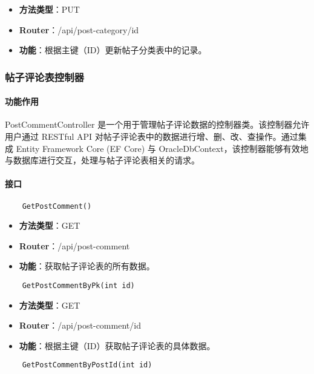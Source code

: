 \begin{itemize}
	\item \textbf{方法类型}：PUT
	\item \textbf{Router}：/api/post-category/{id}
	\item \textbf{功能}：根据主键（ID）更新帖子分类表中的记录。
\end{itemize}

\subsubsection{帖子评论表控制器}

\paragraph{功能作用}

PostCommentController 是一个用于管理帖子评论数据的控制器类。该控制器允许用户通过 RESTful API 对帖子评论表中的数据进行增、删、改、查操作。通过集成 Entity Framework Core (EF Core) 与 OracleDbContext，该控制器能够有效地与数据库进行交互，处理与帖子评论表相关的请求。

\paragraph{接口}

\begin{verbatim}
	GetPostComment()
\end{verbatim}

\begin{itemize}
	\item \textbf{方法类型}：GET
	\item \textbf{Router}：/api/post-comment
	\item \textbf{功能}：获取帖子评论表的所有数据。
\end{itemize}

\begin{verbatim}
	GetPostCommentByPk(int id)
\end{verbatim}

\begin{itemize}
	\item \textbf{方法类型}：GET
	\item \textbf{Router}：/api/post-comment/{id}
	\item \textbf{功能}：根据主键（ID）获取帖子评论表的具体数据。
\end{itemize}

\begin{verbatim}
	GetPostCommentByPostId(int id)
\end{verbatim}

